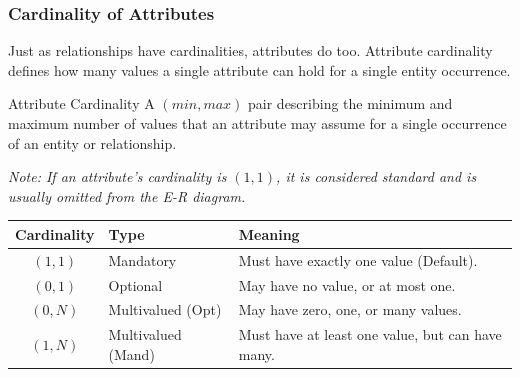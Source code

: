 \subsubsection{Cardinality of Attributes}
Just as relationships have cardinalities, attributes do too. Attribute cardinality defines how many values a single attribute can hold for a single entity occurrence.

\begin{defbox}{Attribute Cardinality}
A $(min, max)$ pair describing the minimum and maximum number of values that an attribute may assume for a single occurrence of an entity or relationship.
\end{defbox}

\textit{Note: If an attribute's cardinality is $(1,1)$, it is considered standard and is usually omitted from the E-R diagram.}

\vspace{0.3cm}
\begin{center}
\begin{tabular}{|c|l|l|}
\hline
\textbf{Cardinality} & \textbf{Type} & \textbf{Meaning} \\
\hline
$(1,1)$ & Mandatory & Must have exactly one value (Default). \\
$(0,1)$ & Optional & May have no value, or at most one. \\
$(0,N)$ & Multivalued (Opt) & May have zero, one, or many values. \\
$(1,N)$ & Multivalued (Mand) & Must have at least one value, but can have many. \\
\hline
\end{tabular}
\end{center}

